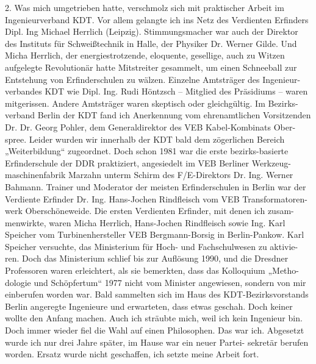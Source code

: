 \documentclass[12pt,a4paper]{article}
\begin{document}
2. Was mich umgetrieben hatte, verschmolz sich mit praktischer Arbeit im
Ingenieurverband KDT. Vor allem gelangte ich ins Netz des Verdienten Erfinders
Dipl. Ing Michael Herrlich (Leipzig). Stimmungsmacher war auch der Direktor
des Instituts für Schweißtechnik in Halle, der Physiker Dr. Werner Gilde. Und
Micha Herrlich, der energiestrotzende, eloquente, gesellige, auch zu Witzen
aufgelegte Revolutionär hatte Mitstreiter gesammelt, um einen Schneeball zur
Entstehung von Erfinderschulen zu wälzen. Einzelne Amtsträger des Ingenieur-
verbandes KDT wie Dipl. Ing. Rudi Höntzsch – Mitglied des Präsidiums – waren
mitgerissen. Andere Amtsträger waren skeptisch oder gleichgültig. Im Bezirks-
verband Berlin der KDT fand ich Anerkennung vom ehrenamtlichen Vorsitzenden
Dr. Dr. Georg Pohler, dem Generaldirektor des VEB Kabel-Kombinats Ober-
spree. Leider wurden wir innerhalb der KDT bald dem zögerlichen Bereich
„Weiterbildung“ zugeordnet. Doch schon 1981 war die erste bezirks-basierte
Erfinderschule der DDR praktiziert, angesiedelt im VEB Berliner Werkzeug-
maschinenfabrik Marzahn unterm Schirm des F/E-Direktors Dr. Ing. Werner
Bahmann. Trainer und Moderator der meisten Erfinderschulen in Berlin war der
Verdiente Erfinder Dr. Ing. Hans-Jochen Rindfleisch vom VEB Transformatoren-
werk Oberschöneweide. Die ersten Verdienten Erfinder, mit denen ich zusam-
menwirkte, waren Micha Herrlich, Hans-Jochen Rindfleisch sowie Ing. Karl
Speicher vom Turbinenhersteller VEB Bergmann-Borsig in Berlin-Pankow. Karl
Speicher versuchte, das Ministerium für Hoch- und Fachschulwesen zu aktivie-
ren. Doch das Ministerium schlief bis zur Auflösung 1990, und die Dresdner
Professoren waren erleichtert, als sie bemerkten, dass das Kolloquium „Metho-
dologie und Schöpfertum“ 1977 nicht vom Minister angewiesen, sondern von mir
einberufen worden war. Bald sammelten sich im Haus des KDT-Bezirksvorstands
Berlin angeregte Ingenieure und erwarteten, dass etwas geschah.  Doch keiner
wollte den Anfang machen. Auch ich sträubte mich, weil ich kein Ingenieur
bin. Doch immer wieder fiel die Wahl auf einen Philosophen. Das war
ich. Abgesetzt wurde ich nur drei Jahre später, im Hause war ein neuer Partei-
sekretär berufen worden. Ersatz wurde nicht geschaffen, ich setzte meine
Arbeit fort.
\end{document}
